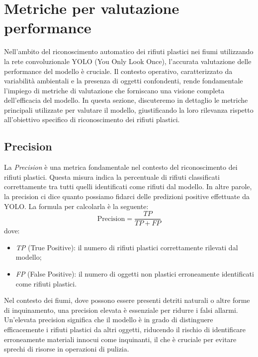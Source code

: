 \section{Metriche per valutazione performance}

Nell'ambito del riconoscimento automatico dei rifiuti plastici nei fiumi utilizzando la rete convoluzionale YOLO (You Only Look Once), l'accurata valutazione delle performance del modello è cruciale. Il contesto operativo, caratterizzato da variabilità ambientali e la presenza di oggetti confondenti, rende fondamentale l'impiego di metriche di valutazione che forniscano una visione completa dell'efficacia del modello. In questa sezione, discuteremo in dettaglio le metriche principali utilizzate per valutare il modello, giustificando la loro rilevanza rispetto all'obiettivo specifico di riconoscimento dei rifiuti plastici.

\subsection*{Precision}

La \textit{Precision} è una metrica fondamentale nel contesto del riconoscimento dei rifiuti plastici. Questa misura indica la percentuale di rifiuti classificati correttamente tra tutti quelli identificati come rifiuti dal modello. In altre parole, la precision ci dice quanto possiamo fidarci delle predizioni positive effettuate da YOLO. La formula per calcolarla è la seguente:
\begin{equation}
\text{Precision} = \frac{TP}{TP + FP}
\end{equation}
dove:
\begin{itemize}
    \item \textit{TP} (True Positive): il numero di rifiuti plastici correttamente rilevati dal modello;
    \item \textit{FP} (False Positive): il numero di oggetti non plastici erroneamente identificati come rifiuti plastici.
\end{itemize}

Nel contesto dei fiumi, dove possono essere presenti detriti naturali o altre forme di inquinamento, una precision elevata è essenziale per ridurre i falsi allarmi. Un'elevata precision significa che il modello è in grado di distinguere efficacemente i rifiuti plastici da altri oggetti, riducendo il rischio di identificare erroneamente materiali innocui come inquinanti, il che è cruciale per evitare sprechi di risorse in operazioni di pulizia.

